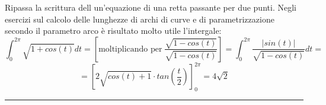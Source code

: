 Ripassa la scrittura dell un'equazione di una retta passante per due punti.\newline
\newline
Negli esercizi sul calcolo delle lunghezze di archi di curve e di parametrizzazione secondo il parametro arco è risultato molto utile l'intergale:
\[
    \int_{0}^{2\pi} \sqrt{1 + cos(t)}dt = \left[\text{moltiplicando per} \; \frac{\sqrt{1-cos(t)}}{\sqrt{1-cos(t)}}\right] = \int_{0}^{2\pi}\frac{|sin(t)|}{\sqrt{1-cos(t)}}dt =
\]
\[
    = [2 \sqrt{cos(t) +1}\cdot  tan(\frac{t}{2}) ]_0^{2\pi} = 4 \sqrt{2}
\]
\rule{\textwidth}{2pt}